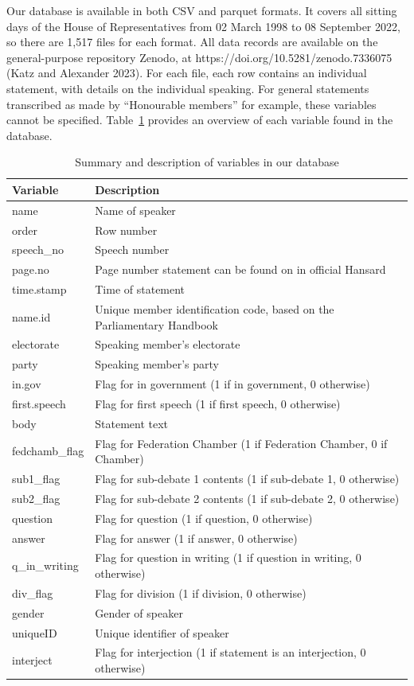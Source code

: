 \documentclass[
  letterpaper,
  DIV=11,
  numbers=noendperiod]{scrartcl}
\begin{document}
Our database is available in both CSV and parquet formats. It covers all
sitting days of the House of Representatives from 02 March 1998 to 08
September 2022, so there are 1,517 files for each format. All data
records are available on the general-purpose repository Zenodo, at
https://doi.org/10.5281/zenodo.7336075 (Katz and Alexander 2023). For
each file, each row contains an individual statement, with details on
the individual speaking. For general statements transcribed as made by
``Honourable members'' for example, these variables cannot be specified.
Table~\ref{tbl-vars} provides an overview of each variable found in the
database.

\hypertarget{tbl-vars}{}
\begin{table}[H]
\caption{\label{tbl-vars}Summary and description of variables in our database }\tabularnewline

\centering
\begin{tabular}{ll}
\toprule
Variable & Description\\
\midrule
name & Name of speaker\\
order & Row number\\
speech\_no & Speech number\\
page.no & Page number statement can be found on in official Hansard\\
time.stamp & Time of statement\\
\addlinespace
name.id & Unique member identification code, based on the Parliamentary Handbook\\
electorate & Speaking member's electorate\\
party & Speaking member's party\\
in.gov & Flag for in government (1 if in government, 0 otherwise)\\
first.speech & Flag for first speech (1 if first speech, 0 otherwise)\\
\addlinespace
body & Statement text\\
fedchamb\_flag & Flag for Federation Chamber (1 if Federation Chamber, 0 if Chamber)\\
sub1\_flag & Flag for sub-debate 1 contents (1 if sub-debate 1, 0 otherwise)\\
sub2\_flag & Flag for sub-debate 2 contents (1 if sub-debate 2, 0 otherwise)\\
question & Flag for question (1 if question, 0 otherwise)\\
\addlinespace
answer & Flag for answer (1 if answer, 0 otherwise)\\
q\_in\_writing & Flag for question in writing (1 if question in writing, 0 otherwise)\\
div\_flag & Flag for division (1 if division, 0 otherwise)\\
gender & Gender of speaker\\
uniqueID & Unique identifier of speaker\\
\addlinespace
interject & Flag for interjection (1 if statement is an interjection, 0 otherwise)\\
\bottomrule
\end{tabular}
\end{table}
\end{document}
